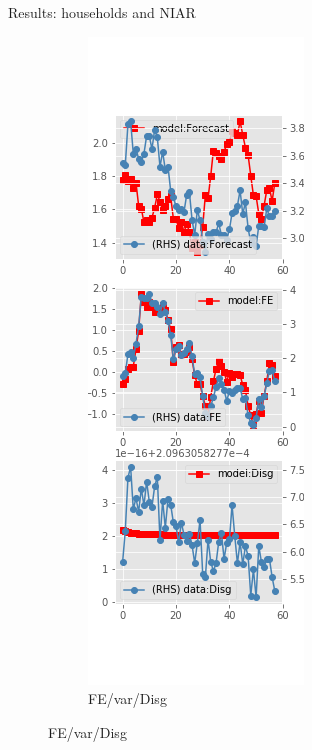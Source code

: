 \documentclass{beamer}
\begin{document}
\begin{frame}{Results: households and NIAR}
\begin{figure}[ht]
\begin{subfigure}[b]{0.19\textwidth}
		\end{subfigure}
		\hfill
		\begin{subfigure}[b]{0.19\textwidth}
			\caption{FE/var/Disg}
			\includegraphics[width=\textwidth, height = 0.8\textheight]{figuresDraft/sce_ni_est_diag4.png}
		\end{subfigure}
	\end{figure}
\end{frame}
\end{document}
